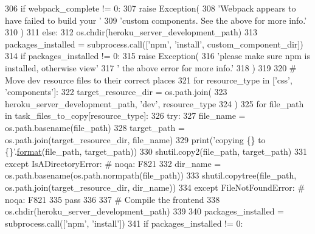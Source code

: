 \begin{DoxyCode}
306         \textcolor{keywordflow}{if} webpack\_complete != 0:
307             \textcolor{keywordflow}{raise} Exception(
308                 \textcolor{stringliteral}{'Webpack appears to have failed to build your '}
309                 \textcolor{stringliteral}{'custom components. See the above for more info.'}
310             )
311     \textcolor{keywordflow}{else}:
312         os.chdir(heroku\_server\_development\_path)
313         packages\_installed = subprocess.call([\textcolor{stringliteral}{'npm'}, \textcolor{stringliteral}{'install'}, custom\_component\_dir])
314         \textcolor{keywordflow}{if} packages\_installed != 0:
315             \textcolor{keywordflow}{raise} Exception(
316                 \textcolor{stringliteral}{'please make sure npm is installed, otherwise view'}
317                 \textcolor{stringliteral}{' the above error for more info.'}
318             )
319 
320     \textcolor{comment}{# Move dev resource files to their correct places}
321     \textcolor{keywordflow}{for} resource\_type \textcolor{keywordflow}{in} [\textcolor{stringliteral}{'css'}, \textcolor{stringliteral}{'components'}]:
322         target\_resource\_dir = os.path.join(
323             heroku\_server\_development\_path, \textcolor{stringliteral}{'dev'}, resource\_type
324         )
325         \textcolor{keywordflow}{for} file\_path \textcolor{keywordflow}{in} task\_files\_to\_copy[resource\_type]:
326             \textcolor{keywordflow}{try}:
327                 file\_name = os.path.basename(file\_path)
328                 target\_path = os.path.join(target\_resource\_dir, file\_name)
329                 print(\textcolor{stringliteral}{'copying \{\} to \{\}'}.\hyperlink{namespaceparlai_1_1chat__service_1_1services_1_1messenger_1_1shared__utils_a32e2e2022b824fbaf80c747160b52a76}{format}(file\_path, target\_path))
330                 shutil.copy2(file\_path, target\_path)
331             \textcolor{keywordflow}{except} IsADirectoryError:  \textcolor{comment}{# noqa: F821}
332                 dir\_name = os.path.basename(os.path.normpath(file\_path))
333                 shutil.copytree(file\_path, os.path.join(target\_resource\_dir, dir\_name))
334             \textcolor{keywordflow}{except} FileNotFoundError:  \textcolor{comment}{# noqa: F821}
335                 \textcolor{keywordflow}{pass}
336 
337     \textcolor{comment}{# Compile the frontend}
338     os.chdir(heroku\_server\_development\_path)
339 
340     packages\_installed = subprocess.call([\textcolor{stringliteral}{'npm'}, \textcolor{stringliteral}{'install'}])
341     \textcolor{keywordflow}{if} packages\_installed != 0:

\end{DoxyCode}
